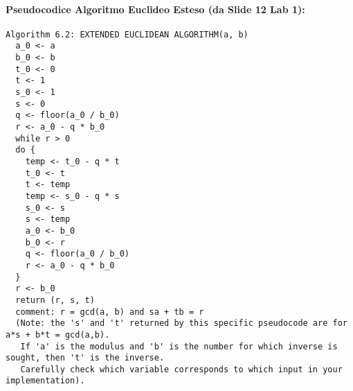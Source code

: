 \paragraph{Pseudocodice Algoritmo Euclideo Esteso (da Slide 12 Lab 1):}
\begin{verbatim}
Algorithm 6.2: EXTENDED EUCLIDEAN ALGORITHM(a, b)
  a_0 <- a
  b_0 <- b
  t_0 <- 0
  t <- 1
  s_0 <- 1
  s <- 0
  q <- floor(a_0 / b_0)
  r <- a_0 - q * b_0
  while r > 0
  do {
    temp <- t_0 - q * t
    t_0 <- t
    t <- temp
    temp <- s_0 - q * s
    s_0 <- s
    s <- temp
    a_0 <- b_0
    b_0 <- r
    q <- floor(a_0 / b_0)
    r <- a_0 - q * b_0
  }
  r <- b_0
  return (r, s, t)
  comment: r = gcd(a, b) and sa + tb = r
  (Note: the 's' and 't' returned by this specific pseudocode are for a*s + b*t = gcd(a,b).
   If 'a' is the modulus and 'b' is the number for which inverse is sought, then 't' is the inverse.
   Carefully check which variable corresponds to which input in your implementation).
\end{verbatim}

